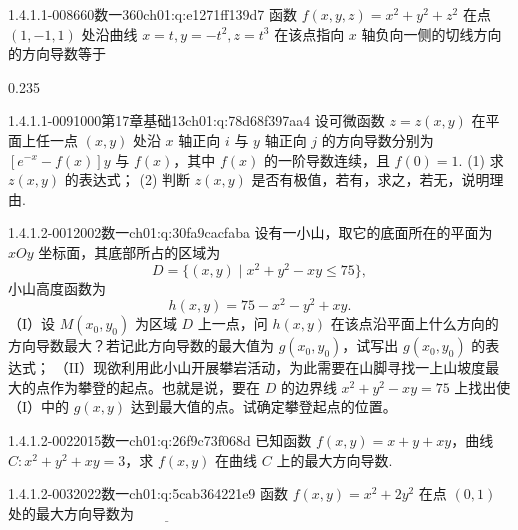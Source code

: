 \begin{q}{1.4.1.1-008}{660数一360}{ch01:q:e1271ff139d7}
函数 $f(x,y,z)=x^2+y^2+z^2$ 在点 $(1,-1,1)$ 处沿曲线 $x=t,y=-t^2,z=t^3$ 在该点指向 $x$ 轴负向一侧的切线方向的方向导数等于
\begin{opts}{0.235}
\hfill{}\hfill{}\hfill{}
\end{opts}
\end{q}

\begin{q}{1.4.1.1-009}{1000第17章基础13}{ch01:q:78d68f397aa4}
设可微函数 $z=z(x,y)$ 在平面上任一点 $(x,y)$ 处沿 $x$ 轴正向 $i$ 与 $y$ 轴正向 $j$ 的方向导数分别为 $[e^{-x}-f(x)]y$ 与 $f(x)$，其中 $f(x)$ 的一阶导数连续，且 $f(0)=1$.
(1) 求 $z(x,y)$ 的表达式；
(2) 判断 $z(x,y)$ 是否有极值，若有，求之，若无，说明理由.
\end{q}

\par\addvspace{2.4ex}\noindent
\begin{minipage}{\linewidth}

\begin{q}{1.4.1.2-001}{2002数一}{ch01:q:30fa9cacfaba}
设有一小山，取它的底面所在的平面为 $xOy$ 坐标面，其底部所占的区域为
\[
D=\{(x,y)\mid x^2+y^2-xy\leqslant 75\},
\]
小山高度函数为
\[
h(x,y)=75-x^2-y^2+xy.
\]
（I）设 $M(x_0,y_0)$ 为区域 $D$ 上一点，问 $h(x,y)$ 在该点沿平面上什么方向的方向导数最大？若记此方向导数的最大值为 $g(x_0,y_0)$，试写出 $g(x_0,y_0)$ 的表达式；
（II）现欲利用此小山开展攀岩活动，为此需要在山脚寻找一上山坡度最大的点作为攀登的起点。也就是说，要在 $D$ 的边界线 $x^2+y^2-xy=75$ 上找出使（I）中的 $g(x,y)$ 达到最大值的点。试确定攀登起点的位置。
\end{q}
\end{minipage}


\begin{q}{1.4.1.2-002}{2015数一}{ch01:q:26f9c73f068d}
已知函数 $f(x,y)=x+y+xy$，曲线 $C:x^{2}+y^{2}+xy=3$，求 $f(x,y)$ 在曲线 $C$ 上的最大方向导数.
\end{q}

\begin{q}{1.4.1.2-003}{2022数一}{ch01:q:5cab364221e9}
函数 $f(x,y)=x^2+2y^2$ 在点 $(0,1)$ 处的最大方向导数为 $\underline{\hspace{4em}}$
\end{q}

